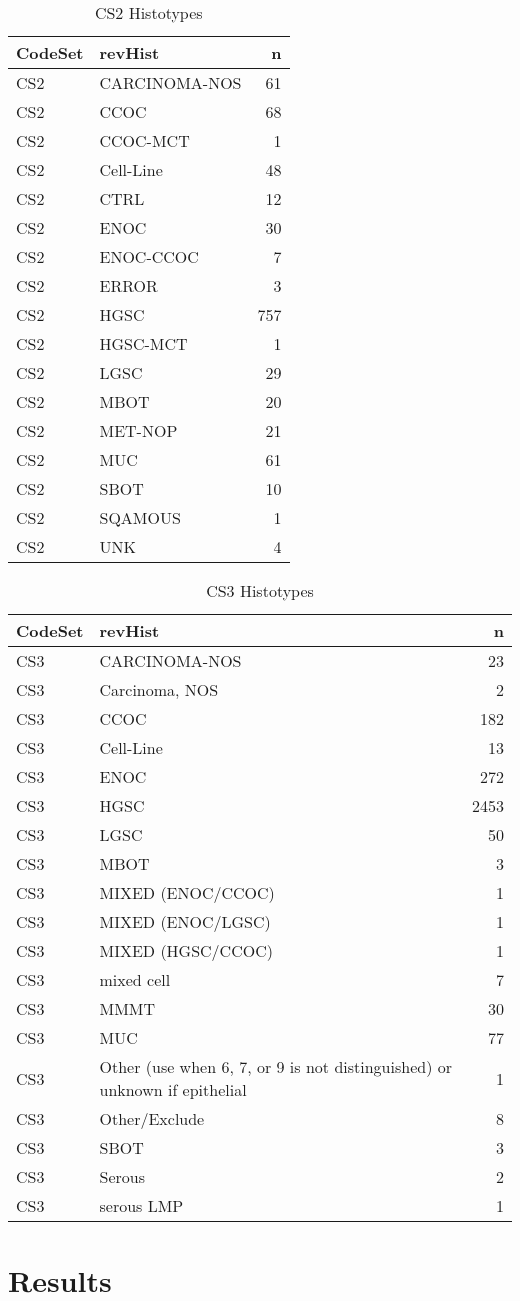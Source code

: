 \documentclass[
]{report}
\begin{document}
\begin{table}

\caption{\label{tab:dist-cs2}CS2 Histotypes}
\centering
\begin{tabular}[t]{l|l|r}
\hline
CodeSet & revHist & n\\
\hline
CS2 & CARCINOMA-NOS & 61\\
\hline
CS2 & CCOC & 68\\
\hline
CS2 & CCOC-MCT & 1\\
\hline
CS2 & Cell-Line & 48\\
\hline
CS2 & CTRL & 12\\
\hline
CS2 & ENOC & 30\\
\hline
CS2 & ENOC-CCOC & 7\\
\hline
CS2 & ERROR & 3\\
\hline
CS2 & HGSC & 757\\
\hline
CS2 & HGSC-MCT & 1\\
\hline
CS2 & LGSC & 29\\
\hline
CS2 & MBOT & 20\\
\hline
CS2 & MET-NOP & 21\\
\hline
CS2 & MUC & 61\\
\hline
CS2 & SBOT & 10\\
\hline
CS2 & SQAMOUS & 1\\
\hline
CS2 & UNK & 4\\
\hline
\end{tabular}
\end{table}

\begin{table}

\caption{\label{tab:dist-cs3}CS3 Histotypes}
\centering
\begin{tabular}[t]{l|l|r}
\hline
CodeSet & revHist & n\\
\hline
CS3 & CARCINOMA-NOS & 23\\
\hline
CS3 & Carcinoma, NOS & 2\\
\hline
CS3 & CCOC & 182\\
\hline
CS3 & Cell-Line & 13\\
\hline
CS3 & ENOC & 272\\
\hline
CS3 & HGSC & 2453\\
\hline
CS3 & LGSC & 50\\
\hline
CS3 & MBOT & 3\\
\hline
CS3 & MIXED (ENOC/CCOC) & 1\\
\hline
CS3 & MIXED (ENOC/LGSC) & 1\\
\hline
CS3 & MIXED (HGSC/CCOC) & 1\\
\hline
CS3 & mixed cell & 7\\
\hline
CS3 & MMMT & 30\\
\hline
CS3 & MUC & 77\\
\hline
CS3 & Other (use when 6, 7, or 9 is not distinguished) or unknown if epithelial & 1\\
\hline
CS3 & Other/Exclude & 8\\
\hline
CS3 & SBOT & 3\\
\hline
CS3 & Serous & 2\\
\hline
CS3 & serous LMP & 1\\
\hline
\end{tabular}
\end{table}

\hypertarget{results}{%
\chapter{Results}\label{results}}

  
\end{document}
